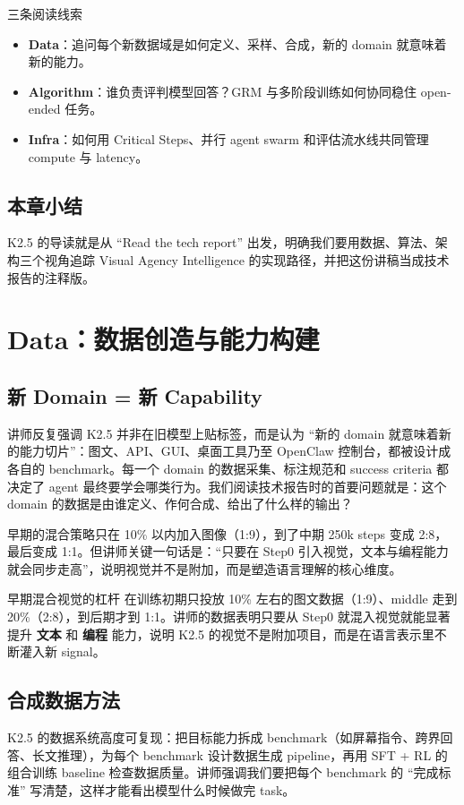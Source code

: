 \documentclass[a4paper]{article}
\begin{document}
\begin{knowledgebox}{三条阅读线索}
\begin{itemize}
    \item \textbf{Data}：追问每个新数据域是如何定义、采样、合成，新的 domain 就意味着新的能力。
    \item \textbf{Algorithm}：谁负责评判模型回答？GRM 与多阶段训练如何协同稳住 open-ended 任务。
    \item \textbf{Infra}：如何用 Critical Steps、并行 agent swarm 和评估流水线共同管理 compute 与 latency。
\end{itemize}
\end{knowledgebox}

\subsection{本章小结}
K2.5 的导读就是从 ``Read the tech report'' 出发，明确我们要用数据、算法、架构三个视角追踪 Visual Agency Intelligence 的实现路径，并把这份讲稿当成技术报告的注释版。
\section{Data：数据创造与能力构建}

\subsection{新 Domain = 新 Capability}
讲师反复强调 K2.5 并非在旧模型上贴标签，而是认为 ``新的 domain 就意味着新的能力切片''：图文、API、GUI、桌面工具乃至 OpenClaw 控制台，都被设计成各自的 benchmark。每一个 domain 的数据采集、标注规范和 success criteria 都决定了 agent 最终要学会哪类行为。我们阅读技术报告时的首要问题就是：这个 domain 的数据是由谁定义、作何合成、给出了什么样的输出？

早期的混合策略只在 10\% 以内加入图像（1:9），到了中期 250k steps 变成 2:8，最后变成 1:1。但讲师关键一句话是：``只要在 Step0 引入视觉，文本与编程能力就会同步走高''，说明视觉并不是附加，而是塑造语言理解的核心维度。

\begin{importantbox}{早期混合视觉的杠杆}
在训练初期只投放 10\% 左右的图文数据（1:9）、middle 走到 20\%（2:8），到后期才到 1:1。讲师的数据表明只要从 Step0 就混入视觉就能显著提升 \textbf{文本} 和 \textbf{编程} 能力，说明 K2.5 的视觉不是附加项目，而是在语言表示里不断灌入新 signal。
\end{importantbox}

\subsection{合成数据方法}
K2.5 的数据系统高度可复现：把目标能力拆成 benchmark（如屏幕指令、跨界回答、长文推理），为每个 benchmark 设计数据生成 pipeline，再用 SFT + RL 的组合训练 baseline 检查数据质量。讲师强调我们要把每个 benchmark 的 ``完成标准'' 写清楚，这样才能看出模型什么时候做完 task。
\end{document}
